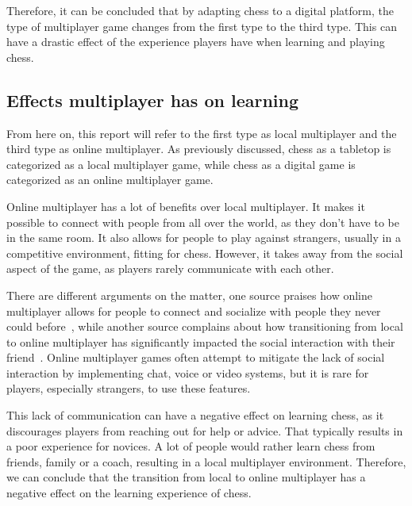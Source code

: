 Therefore, it can be concluded that by adapting chess to a digital platform, the type of multiplayer game changes from 
the first type to the third type.
This can have a drastic effect of the experience players have when learning and playing chess.

\subsection{Effects multiplayer has on learning}\label{subsec:effects-multiplayer-has-on-learning}

From here on, this report will refer to the first type as local multiplayer and the third type as online 
multiplayer.
As previously discussed, chess as a tabletop is categorized as a local multiplayer game, while chess as a digital game 
is categorized as an online multiplayer game.

Online multiplayer has a lot of benefits over local multiplayer.
It makes it possible to connect with people from all over the world, as they don't have to be in the same room.
It also allows for people to play against strangers, usually in a competitive environment, fitting for chess.
However, it takes away from the social aspect of the game, as players rarely communicate with each other.

There are different arguments on the matter, one source praises how online multiplayer allows for people to connect and 
socialize with people they never could before~\cite{multiplayer-online}, while another source complains about how 
transitioning from local to online multiplayer has significantly impacted the social interaction with their 
friend~\cite{multiplayer-local}. 
Online multiplayer games often attempt to mitigate the lack of social interaction by implementing chat, voice or video 
systems, but it is rare for players, especially strangers, to use these features.

This lack of communication can have a negative effect on learning chess, as it discourages players from reaching out 
for help or advice.
That typically results in a poor experience for novices.
A lot of people would rather learn chess from friends, family or a coach, resulting in a local multiplayer environment.
Therefore, we can conclude that the transition from local to online multiplayer has a negative effect on the learning 
experience of chess.
